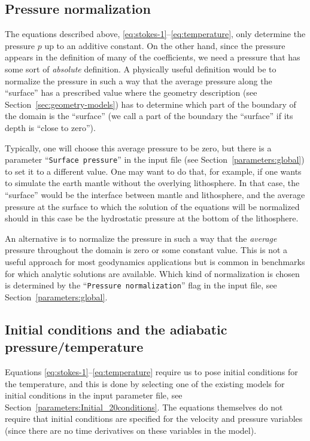 \documentclass{article}
\begin{document}
\subsection{Pressure normalization}
\label{sec:pressure}

The equations described above, \eqref{eq:stokes-1}--\eqref{eq:temperature},
only determine the pressure $p$ up to an additive constant. On the other hand,
since the pressure appears in the definition of many of the coefficients, we
need a pressure that has some sort of \textit{absolute} definition. A
physically useful definition would be to normalize the pressure in such a way
that the average pressure along the ``surface'' has a prescribed value where
the geometry description (see Section~\ref{sec:geometry-models}) has to
determine which part of the boundary of the domain is the ``surface'' (we call
a part of the boundary the ``surface'' if its depth is ``close to zero'').

Typically, one will choose this average pressure to be zero, but there is a
parameter ``\texttt{Surface pressure}''
in the input file (see Section~\ref{parameters:global}) to set it to
a different value. One may want to do that, for example, if one wants to
simulate the earth mantle without the overlying lithosphere. In that case, the
``surface'' would be the interface between mantle and lithosphere, and the
average pressure at the surface to which the solution of the equations will be
normalized should in this case be the hydrostatic pressure at the bottom of
the lithosphere.

An alternative is to normalize the pressure in such a way that the
\textit{average} pressure throughout the domain is zero or some constant
value. This is not a useful approach for most geodynamics applications but is
common in benchmarks for which analytic solutions are available. Which kind of
normalization is chosen is determined by the ``\texttt{Pressure
  normalization}'' flag in the input file,
see Section~\ref{parameters:global}.


\subsection{Initial conditions and the adiabatic pressure/temperature}
\label{sec:adiabatic}

Equations \eqref{eq:stokes-1}--\eqref{eq:temperature} require us to
pose initial conditions for the temperature, and this is done by
selecting one of the existing models for initial conditions in the
input parameter file, see
Section~\ref{parameters:Initial_20conditions}. The equations
themselves do not require that initial conditions are specified for
the velocity and pressure variables (since there are no time
derivatives on these variables in the model).
\end{document}
